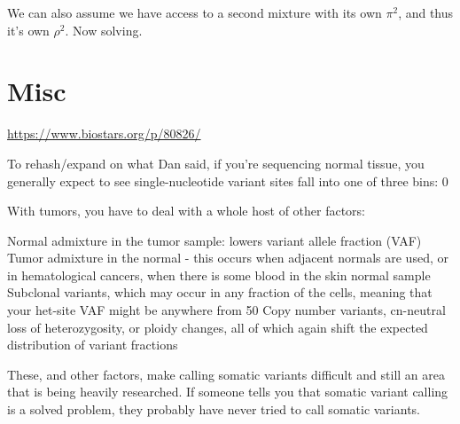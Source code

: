 \documentclass[10pt]{article}
\begin{document}
We can also assume we have access to a second mixture with its own $\pi^2$, and thus it's own $\rho^2$. Now solving.

\section{Misc}
\url{https://www.biostars.org/p/80826/}

To rehash/expand on what Dan said, if you're sequencing normal tissue, you generally expect to see single-nucleotide variant sites fall into one of three bins: 0%

With tumors, you have to deal with a whole host of other factors:

    Normal admixture in the tumor sample: lowers variant allele fraction (VAF)
        Tumor admixture in the normal - this occurs when adjacent normals are used, or in hematological cancers, when there is some blood in the skin normal sample
            Subclonal variants, which may occur in any fraction of the cells, meaning that your het-site VAF might be anywhere from 50%
                Copy number variants, cn-neutral loss of heterozygosity, or ploidy changes, all of which again shift the expected distribution of variant fractions

                These, and other factors, make calling somatic variants difficult and still an area that is being heavily researched. If someone tells you that somatic variant calling is a solved problem, they probably have never tried to call somatic variants.
\end{document}
